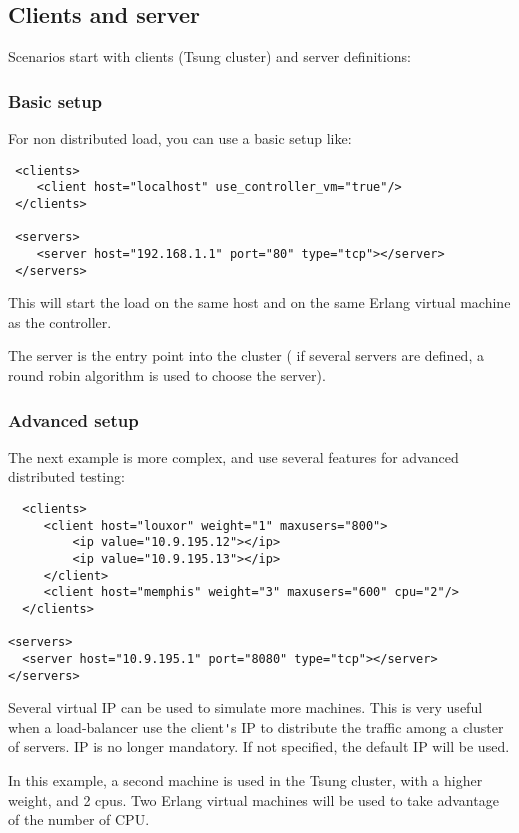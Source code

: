 \documentclass{TSUNG-en}
\begin{document}
\subsection{Clients and server}


 Scenarios start with clients (Tsung cluster) and server definitions:

\subsubsection{Basic setup}
For non distributed load, you can use a basic setup like:

\begin{Verbatim}
 <clients>
    <client host="localhost" use_controller_vm="true"/>
 </clients>

 <servers>
    <server host="192.168.1.1" port="80" type="tcp"></server>
 </servers>
 \end{Verbatim}

This will start the load on the same host and on the same Erlang
virtual machine as the controller.

The server is the entry point into the cluster (
if several servers are defined, a round robin algorithm is used to
choose the server).

\subsubsection{Advanced setup}

The next example is more complex, and use several features for
advanced distributed testing:

\begin{Verbatim}
  <clients>
     <client host="louxor" weight="1" maxusers="800">
         <ip value="10.9.195.12"></ip>
         <ip value="10.9.195.13"></ip>
     </client>
     <client host="memphis" weight="3" maxusers="600" cpu="2"/>
  </clients>

<servers>
  <server host="10.9.195.1" port="8080" type="tcp"></server>
</servers>
 \end{Verbatim}


Several virtual IP can be used to simulate more machines. This is
 very useful when a load-balancer use the client\verb|'|s IP to
 distribute the traffic among a cluster of servers.  IP is no longer mandatory. If not specified, the default IP will
 be used.

 In this example, a second machine is used in the Tsung cluster,
 with a higher weight, and 2 cpus. Two Erlang virtual machines will be
 used to take advantage of the number of CPU.
\end{document}
